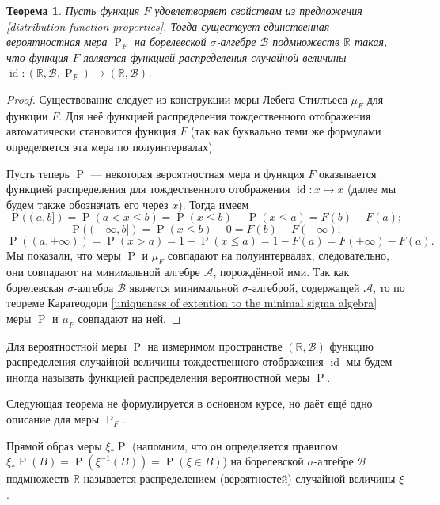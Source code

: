 \documentclass[12pt]{article}
\newtheorem{theorem}{Теорема}
\numberwithin{theorem}{section}
\theoremstyle{definition}
\newcommand{\defin}[2]{\hypertarget{#2}{{\color{red} #1}}}
\newcommand{\RR}{\mathbb{R}}
\newcommand{\calA}{\mathcal{A}}
\newcommand{\calB}{\mathcal{B}}
\newcommand{\id}{\operatorname{id}}
\newcommand{\prob}{\operatorname{P}}
\begin{document}
	\begin{theorem}
		Пусть функция $ F $ удовлетворяет свойствам из предложения \ref{distribution function properties}.
 		Тогда существует единственная вероятностная мера $ \prob_F $ на борелевской $ \sigma $-алгебре $ \calB $
 		подмножеств $ \RR $ такая, что функция $ F $ является функцией распределения случайной величины
 		$ \id \colon (\RR, \calB, \prob_F) \to (\RR, \calB) $.
	\end{theorem}
	
	\begin{proof}
		Существование следует из конструкции меры Лебега-Стилтьеса $ \mu_F $ для функции $ F $.
		Для неё функцией распределения тождественного отображения автоматически становится функция $ F $
		(так как буквально теми же формулами определяется эта мера по полуинтервалах).
		
		Пусть теперь $ \prob $ --- некоторая вероятностная мера 
		и функция $ F $ оказывается функцией распределения для тождественного отображения $ \id \colon x \mapsto x $
		(далее мы будем также обозначать его через $ x $).
		Тогда имеем
		$$ \prob((a, b]) = \prob(a < x \leqslant b) = \prob(x \leqslant b) - \prob(x \leqslant a) = F(b) - F(a); $$
		$$ \prob((-\infty, b]) = \prob(x \leqslant b) - 0 = F(b) - F(-\infty); $$
		$$ \prob((a, +\infty)) = \prob(x > a) = 1 - \prob(x \leqslant a) = 1 -  F(a) = F(+\infty) - F(a). $$
		Мы показали, что меры $ \prob $ и $ \mu_F $ совпадают на полуинтервалах,
		следовательно, они совпадают на минимальной алгебре $ \calA $, порождённой ими.
		Так как борелевская $ \sigma $-алгебра $ \calB $ является минимальной $ \sigma $-алгеброй, содержащей $ \calA $,
		то по теореме Каратеодори \ref{uniqueness of extention to the minimal sigma algebra}
		меры $ \prob $ и $ \mu_F $ совпадают на ней.
	\end{proof}
	
	Для вероятностной меры $ \prob $ на измеримом пространстве $ (\RR, \calB) $ функцию распределения случайной величины
	тождественного отображения $ \id $ мы будем иногда называть 
	\defin{функцией распределения вероятностной меры $ \prob $}{distribution-function-of-measure}.
	
	Следующая теорема не формулируется в основном курсе, но даёт ещё одно описание для меры $ \prob_F $. 
	
	Прямой образ меры $ \xi_*\prob $ (напомним, что он определяется правилом $ \xi_*\prob(B) = \prob(\xi^{-1}(B)) = \prob(\xi \in B) $) 
	на борелевской $ \sigma $-алгебре $ \calB $ подмножеств $ \RR $
	называется \defin{распределением (вероятностей) случайной величины $ \xi $}{distribution}.
	
\end{document}
